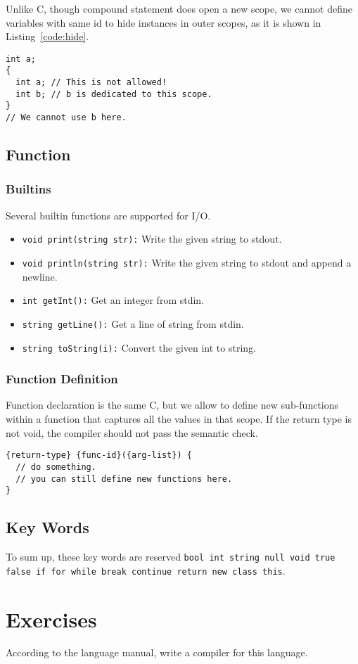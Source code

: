 \documentclass{article}
\begin{document}
Unlike C, though compound statement does open a new scope,
we cannot define variables with same id to hide instances in outer scopes,
as it is shown in Listing~\ref{code:hide}.
\begin{lstlisting}[caption=An example of scope\label{code:hide}]
int a;
{
  int a; // This is not allowed!
  int b; // b is dedicated to this scope.
}
// We cannot use b here.
\end{lstlisting}

\subsection{Function}

\subsubsection{Builtins}

Several builtin functions are supported for I/O.
\begin{itemize}
  \item \texttt{void print(string str):} Write the given string to stdout.
  \item \texttt{void println(string str):} Write the given string to stdout and append a newline.
  \item \texttt{int getInt():} Get an integer from stdin.
  \item \texttt{string getLine():} Get a line of string from stdin.
  \item \texttt{string toString(i):} Convert the given int to string.
\end{itemize}

\subsubsection{Function Definition}

Function declaration is the same C, but we allow to define new sub-functions
within a function that captures all the values in that scope. If the return
type is not void, the compiler should not pass the semantic check.

\begin{lstlisting}[caption=Function Declaration]
{return-type} {func-id}({arg-list}) {
  // do something.
  // you can still define new functions here.
}
\end{lstlisting}

\subsection{Key Words}

To sum up, these key words are reserved \texttt{bool int string null void true false if for while break continue return new class this}.

\section{Exercises}

According to the language manual, write a compiler for this language.
\end{document}
